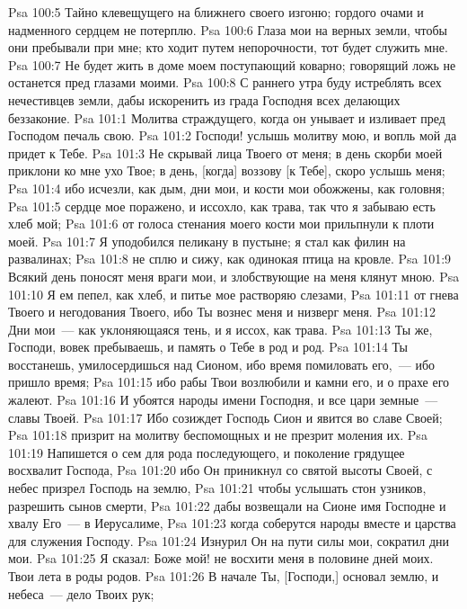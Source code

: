 \vs Psa 100:5 Тайно клевещущего на ближнего своего изгоню; гордого очами и надменного сердцем не потерплю.
\vs Psa 100:6 Глаза мои на верных земли, чтобы они пребывали при мне; кто ходит путем непорочности, тот будет служить мне.
\vs Psa 100:7 Не будет жить в доме моем поступающий коварно; говорящий ложь не останется пред глазами моими.
\vs Psa 100:8 С раннего утра буду истреблять всех нечестивцев земли, дабы искоренить из града Господня всех делающих беззаконие.
\vs Psa 101:1 Молитва страждущего, когда он унывает и изливает пред Господом печаль свою.
\rsbpar\vs Psa 101:2 Господи! услышь молитву мою, и вопль мой да придет к Тебе.
\vs Psa 101:3 Не скрывай лица Твоего от меня; в день скорби моей приклони ко мне ухо Твое; в день, [когда] воззову [к Тебе], скоро услышь меня;
\vs Psa 101:4 ибо исчезли, как дым, дни мои, и кости мои обожжены, как головня;
\vs Psa 101:5 сердце мое поражено, и иссохло, как трава, так что я забываю есть хлеб мой;
\vs Psa 101:6 от голоса стенания моего кости мои прильпнули к плоти моей.
\vs Psa 101:7 Я уподобился пеликану в пустыне; я стал как филин на развалинах;
\vs Psa 101:8 не сплю и сижу, как одинокая птица на кровле.
\vs Psa 101:9 Всякий день поносят меня враги мои, и злобствующие на меня клянут мною.
\vs Psa 101:10 Я ем пепел, как хлеб, и питье мое растворяю слезами,
\vs Psa 101:11 от гнева Твоего и негодования Твоего, ибо Ты вознес меня и низверг меня.
\vs Psa 101:12 Дни мои~--- как уклоняющаяся тень, и я иссох, как трава.
\vs Psa 101:13 Ты же, Господи, вовек пребываешь, и память о Тебе в род и род.
\vs Psa 101:14 Ты восстанешь, умилосердишься над Сионом, ибо время помиловать его,~--- ибо пришло время;
\vs Psa 101:15 ибо рабы Твои возлюбили и камни его, и о прахе его жалеют.
\vs Psa 101:16 И убоятся народы имени Господня, и все цари земные~--- славы Твоей.
\vs Psa 101:17 Ибо созиждет Господь Сион и явится во славе Своей;
\vs Psa 101:18 призрит на молитву беспомощных и не презрит моления их.
\vs Psa 101:19 Напишется о сем для рода последующего, и поколение грядущее восхвалит Господа,
\vs Psa 101:20 ибо Он приникнул со святой высоты Своей, с небес призрел Господь на землю,
\vs Psa 101:21 чтобы услышать стон узников, разрешить сынов смерти,
\vs Psa 101:22 дабы возвещали на Сионе имя Господне и хвалу Его~--- в Иерусалиме,
\vs Psa 101:23 когда соберутся народы вместе и царства для служения Господу.
\vs Psa 101:24 Изнурил Он на пути силы мои, сократил дни мои.
\vs Psa 101:25 Я сказал: Боже мой! не восхити меня в половине дней моих. Твои лета в роды родов.
\vs Psa 101:26 В начале Ты, [Господи,] основал землю, и небеса~--- дело Твоих рук;
